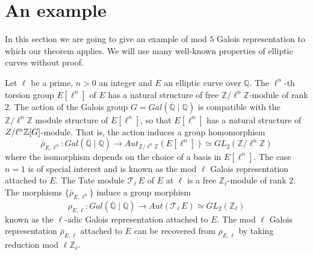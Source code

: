 \documentclass[12pt,reqno]{amsart}
\theoremstyle{plain}
\theoremstyle{definition}
\begin{document}
\section{An example}
In this section we are going to give an example of mod $5$ Galois representation to which our theorem applies. We will use many well-known properties of elliptic curves without proof.

Let $\ell$ be a prime, $n>0$ an integer and $E$ an elliptic curve over $\mathbb Q$. The $\ell^n$-th torsion group $E[\ell^n]$ of $E$ has a natural structure of free $\mathbb Z/\ell^n\mathbb Z$-module of rank $2$. 
The action of the Galois group $G=Gal(\overline{\mathbb Q}\mid\mathbb Q)$ is compatible with the $\mathbb Z/\ell^ n \mathbb Z$ module structure of  $E[\ell^n]$, so that $E[\ell^n]$ has a natural structure of $\mathbb \mathbb Z/\ell^n\mathbb Z[G]$-module.  
That is, the action induces a group homomorphism
$$
\bar\rho_{E,\ell^n}: Gal(\overline{\mathbb Q}\mid \mathbb Q)\longrightarrow Aut_{\mathbb Z/\ell^n\mathbb Z} (E[\ell^n])\simeq GL_2(\mathbb Z/\ell^n\mathbb Z)
$$
where the isomorphism depends on the choice of a basis in $E[\ell^n]$. The case $n=1$ is of special interest and is known as the mod $\ell$ Galois representation attached to $E$. The Tate module $\mathcal T_\ell\, E$ of $E$ at $\ell$ is a free $\mathbb Z_\ell$-module of rank $2$. The morphisms $\{\bar\rho_{E,\ell^n}\}$ induce a group morphism
$$
\rho_{E,\ell}:Gal(\overline{\mathbb Q}\mid \mathbb Q)\longrightarrow Aut (\mathcal T_\ell \, E)\simeq GL_2(\mathbb Z_\ell)
$$
known as the $\ell$-adic Galois representation attached to $E$. The mod $\ell$ Galois representation $\bar\rho_{E,\ell}$ attached to  $E$ can be recovered from $\rho_{E,\ell}$ by taking reduction mod $\ell\mathbb Z_\ell$.
\end{document}
